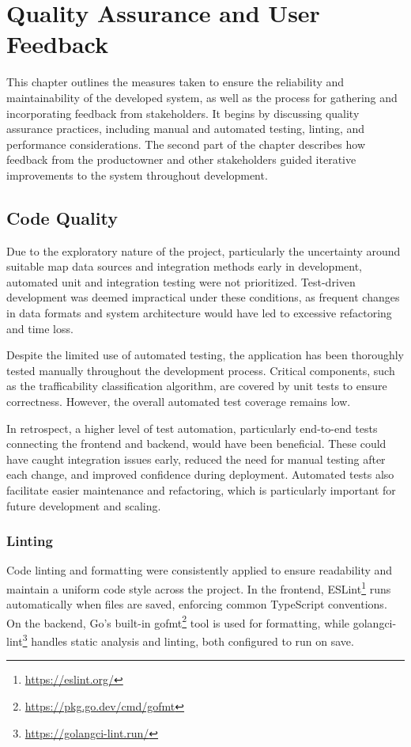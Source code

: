 \chapter{Quality Assurance and User Feedback}\label{chap:qualityassuranceanduserfeedback}

This chapter outlines the measures taken to ensure the reliability and maintainability of the developed system, as well as the process for gathering and incorporating feedback from stakeholders. It begins by discussing quality assurance practices, including manual and automated testing, linting, and performance considerations. The second part of the chapter describes how feedback from the \gls{productowner} and other stakeholders guided iterative improvements to the system throughout development.

\section{Code Quality}

Due to the exploratory nature of the project, particularly the uncertainty around suitable map data sources and integration methods early in development, automated unit and integration testing were not prioritized. Test-driven development was deemed impractical under these conditions, as frequent changes in data formats and system architecture would have led to excessive refactoring and time loss.

Despite the limited use of automated testing, the application has been thoroughly tested manually throughout the development process. Critical components, such as the trafficability classification algorithm, are covered by unit tests to ensure correctness. However, the overall automated test coverage remains low.

In retrospect, a higher level of test automation, particularly end-to-end tests connecting the frontend and backend, would have been beneficial. These could have caught integration issues early, reduced the need for manual testing after each change, and improved confidence during deployment. Automated tests also facilitate easier maintenance and refactoring, which is particularly important for future development and scaling.

\subsection{Linting}

Code linting and formatting were consistently applied to ensure readability and maintain a uniform code style across the project. In the frontend, ESLint\footnote{\url{https://eslint.org/}} runs automatically when files are saved, enforcing common TypeScript conventions. On the backend, Go's built-in gofmt\footnote{\url{https://pkg.go.dev/cmd/gofmt}} tool is used for formatting, while golangci-lint\footnote{\url{https://golangci-lint.run/}} handles static analysis and linting, both configured to run on save.

